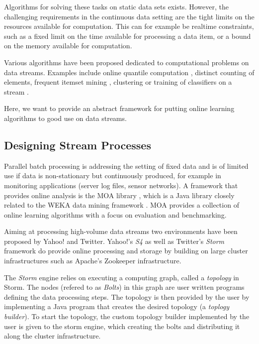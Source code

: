 Algorithms for solving these tasks on static data sets
exists. However, the challenging requirements in the continuous data
setting are the tight limits on the resources available for
computation. This can for example be realtime constraints, such as a
fixed limit on the time available for processing a data item, or a
bound on the memory available for computation.

Various algorithms have been proposed dedicated to computational
problems on data streams. Examples include online quantile computation
\cite{Greenwald/Khanna/2001a,Arasu/Manku/2004a}, distinct counting of
elements, frequent itemset mining
\cite{Charikar02findingfrequent,goethals2007,Cheng06maintainingfrequent},
clustering \cite{sohler2010,Aggarwal:2003} or training of classifiers
on a stream \cite{Domingos/Hulten/2000a}.

Here, we want to provide an abstract framework for putting online
learning algorithms to good use on data streams.

\subsection{Designing Stream Processes}

Parallel batch processing is addressing the setting of fixed data and
is of limited use if data is non-stationary but continuously produced,
for example in monitoring applications (server log files, sensor
networks).  A framework that provides online analysis is the MOA
library \cite{moa}, which is a Java library closely related to the
WEKA data mining framework \cite{weka}. MOA provides a collection of
online learning algorithms with a focus on evaluation and
benchmarking.

Aiming at processing high-volume data streams two environments have
been proposed by Yahoo! and Twitter. Yahoo!'s {\em S4} \cite{s4io} as
well as Twitter's {\em Storm} \cite{storm} framework do provide online
processing and storage by building on large cluster infrastructures such
as Apache's Zookeeper infrastructure.

The {\em Storm} engine relies on executing a computing graph, called a
{\em topology} in Storm. The nodes (refered to as {\em Bolts}) in this
graph are user written programs defining the data processing
steps. The topology is then provided by the user by implementing a
Java program that creates the desired topology (a {\em toplogy
  builder}). To start the topology, the custom topology builder
implemented by the user is given to the storm engine, which creating
the bolts and distributing it along the cluster infrastructure.

